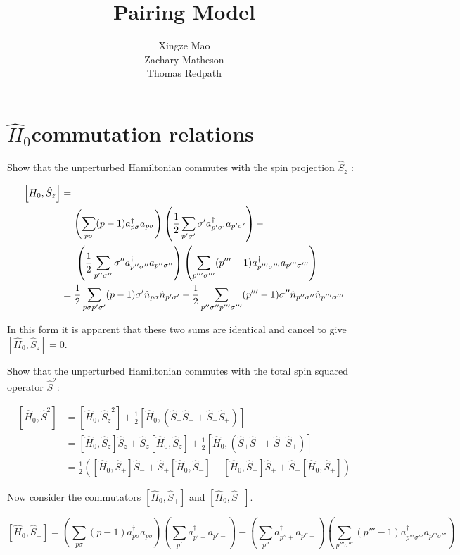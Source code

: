 \documentclass[11pt]{article}
\title{Pairing Model}
\author{Xingze Mao \\ Zachary Matheson \\ Thomas Redpath}
\date{}
\newcommand{\sz}[2]{%
	\ensuremath{ \frac{1}{2} \sum_{#1 #2} #2 a _{#1 #2} ^{\dagger} a _{#1 #2} } }
\newcommand{\splus}[1]{%
	\ensuremath{ \sum_{#1}  a _{#1 +} ^{\dagger} a _{#1 -} } }
\newcommand{\hzero}[2]{%
	\ensuremath{ \sum_{#1 #2} (#1-1) a _{#1 #2} ^{\dagger} a _{#1 #2} }}
\newcommand{\numop}[2]{%
	\ensuremath{ \hat{n} _{#1 #2} }}
\newcommand{\sop}[1]{%
	\ensuremath{ \hat{S}_{#1} } }
\newcommand{\hop}{
	\ensuremath{ \hat{H} _0 }}
\newcommand{\commutator}[2]{%
	\ensuremath{ \left [ #1,#2 \right ] }}
\begin{document}
\maketitle

\section*{\hop commutation relations}

Show that the unperturbed Hamiltonian commutes with the spin projection \sop{z}:


\begin{align*}
	\left [ H _0, \sop{z} \right ] &=\\
	&=\left ( \hzero{p}{\sigma} \right ) \left ( \sz{p'}{\sigma'} \right ) -\\
	& \hspace{5mm} \left ( \sz{p''}{\sigma''} \right ) \left ( \hzero{p'''}{\sigma'''} \right )\\
	&= \frac{1}{2} \sum_{p \sigma p' \sigma'} (p-1) \sigma' \numop{p}{\sigma} \numop{p'}{\sigma'} - \frac{1}{2} \sum_{p'' \sigma'' p''' \sigma'''} (p'''-1) \sigma'' \numop{p''}{\sigma''} \numop{p'''}{\sigma'''}
\end{align*}

In this form it is apparent that these two sums are identical and cancel to give $[\hat{H}_0,\sop{z}]=0$.

Show that the unperturbed Hamiltonian commutes with the total spin squared operator $\hat{S}^2$:

\begin{align}
	\left [ \hat{H}_0, \hat{S}^2 \right ] &= \left [ \hop, \sop{z} ^2 \right ] + \frac{1}{2} \left [ \hop,(\sop{+} \sop{-} + \sop{-}\sop{+}) \right ]\\
	&= \commutator{\hop}{\sop{z}} \sop{z} + \sop{z} \commutator{\hop}{\sop{z}} +\frac{1}{2} \commutator{\hop}{(\sop{+}\sop{-} + \sop{-}\sop{+})}\\
	&= \frac{1}{2} \left ( \commutator{\hop}{\sop{+}} \sop{-} + \sop{+} \commutator{\hop}{\sop{-}} + \commutator{\hop}{\sop{-}} \sop{+} + \sop{-} \commutator{\hop}{\sop{+}} \right )
\end{align}

Now consider the commutators \commutator{\hop}{\sop{+}} and \commutator{\hop}{\sop{-}}.

\begin{equation}
	\commutator{\hop}{\sop{+}} = \left ( \hzero{p}{\sigma} \right ) \left ( \splus{p'} \right ) - \left ( \splus{p''} \right ) \left ( \hzero{p'''}{\sigma'''} \right )
	\label{eq:hsplus}
\end{equation}
\end{document}
